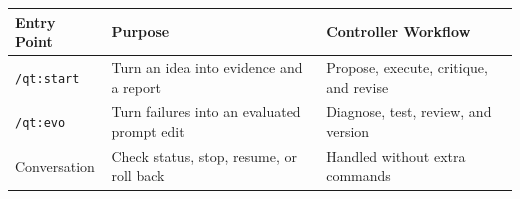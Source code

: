 \begin{tabular}{@{}P{3.0cm}P{4.6cm}P{4.9cm}@{}}
\toprule
\textbf{Entry Point} & \textbf{Purpose} & \textbf{Controller Workflow} \\
\midrule
\texttt{/qt:start} & Turn an idea into evidence and a report & Propose, execute, critique, and revise \\
\texttt{/qt:evo} & Turn failures into an evaluated prompt edit & Diagnose, test, review, and version \\
Conversation & Check status, stop, resume, or roll back & Handled without extra commands \\
\bottomrule
\end{tabular}
